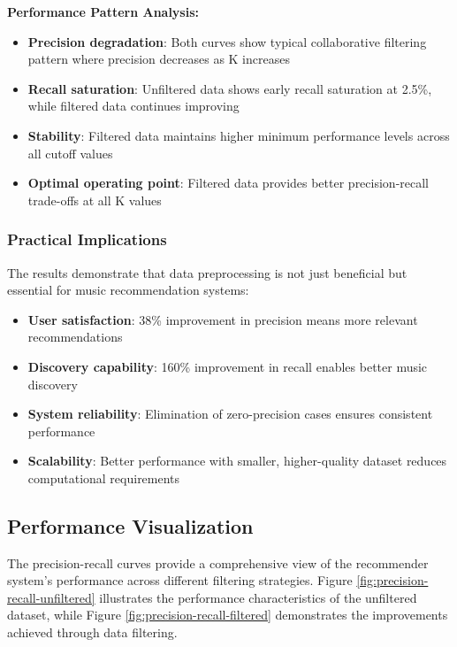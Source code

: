 \documentclass[12pt,a4paper]{article}
\begin{document}
\textbf{Performance Pattern Analysis:}
\begin{itemize}
    \item \textbf{Precision degradation}: Both curves show typical collaborative filtering pattern where precision decreases as K increases
    \item \textbf{Recall saturation}: Unfiltered data shows early recall saturation at 2.5\%, while filtered data continues improving
    \item \textbf{Stability}: Filtered data maintains higher minimum performance levels across all cutoff values
    \item \textbf{Optimal operating point}: Filtered data provides better precision-recall trade-offs at all K values
\end{itemize}

\subsubsection{Practical Implications}

The results demonstrate that data preprocessing is not just beneficial but essential for music recommendation systems:
\begin{itemize}
    \item \textbf{User satisfaction}: 38\% improvement in precision means more relevant recommendations
    \item \textbf{Discovery capability}: 160\% improvement in recall enables better music discovery
    \item \textbf{System reliability}: Elimination of zero-precision cases ensures consistent performance
    \item \textbf{Scalability}: Better performance with smaller, higher-quality dataset reduces computational requirements
\end{itemize}

\subsection{Performance Visualization}

The precision-recall curves provide a comprehensive view of the recommender system's performance across different filtering strategies. Figure \ref{fig:precision-recall-unfiltered} illustrates the performance characteristics of the unfiltered dataset, while Figure \ref{fig:precision-recall-filtered} demonstrates the improvements achieved through data filtering.
\end{document}
